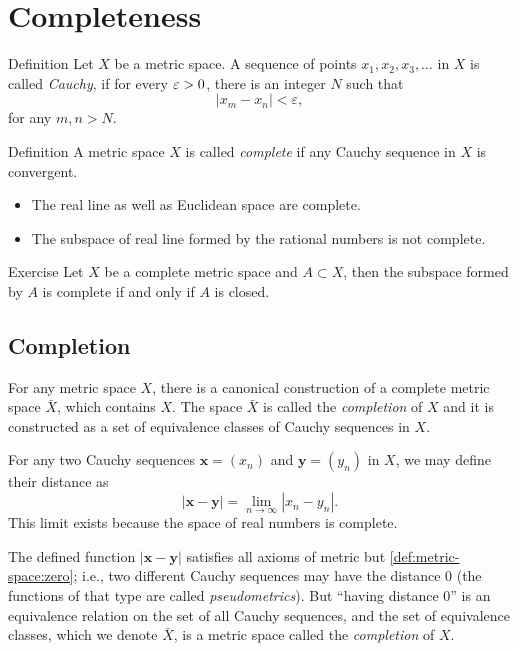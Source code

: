 \section{Completeness}

\begin{thm}{Definition}
Let $X$ be a metric space.
A sequence of points $x_1, x_2, x_3, \ldots$ in $X$ is called \emph{Cauchy}, 
if for every $\varepsilon>0$, 
there is an integer $N$ such that 
$$|x_m - x_n| < \varepsilon,$$
for any $m, n > N$.
\end{thm}

\begin{thm}{Definition}
A metric space $X$ is called \emph{complete} if any Cauchy sequence in $X$ is convergent.
\end{thm}

\begin{itemize}
\item The real line as well as Euclidean space are complete.
\item The subspace of real line formed by the rational numbers is not complete.
\end{itemize}

\begin{thm}{Exercise}\label{ex:close-complete}
Let $X$ be a complete metric space and $A\subset X$,
then the subspace formed by $A$ is complete if and only if $A$ is closed.
\end{thm}



\subsection*{Completion}

For any metric space $X$, 
there is a canonical construction of a complete metric space $\bar X$, 
which contains $X$.
The space $\bar X$ is called the \emph{completion} of $X$ and it is constructed as 
a set of equivalence classes of Cauchy sequences in $X$. 

For any two Cauchy sequences $\bm{x}=(x_n)$ and $\bm{y}=(y_n)$ in $X$, 
we may define their distance as
$$|\bm{x}-\bm{y}| = \lim_{n\to\infty} |x_n-y_n|.$$
This limit exists because the space of real numbers is complete. 

The defined function $|\bm{x}-\bm{y}|$ satisfies all axioms of metric but \ref{def:metric-space:zero};
i.e., two different Cauchy sequences may have the distance $0$ 
(the functions of that type are called \emph{pseudometrics}). 
But ``having distance 0'' is an equivalence relation on the set of all Cauchy sequences, and the set of equivalence classes, which we denote $\bar X$, is a metric space called the \emph{completion} of $X$.  


